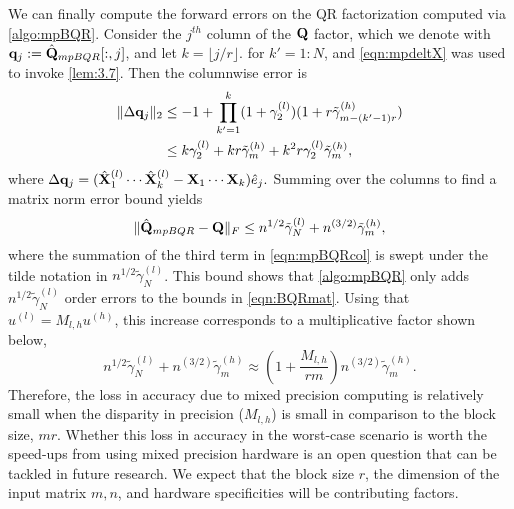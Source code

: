 We can finally compute the forward errors on the QR factorization computed via \cref{algo:mpBQR}.
Consider the $j^{th}$ column of the $\mathbf{Q}$ factor, which we denote with $\mathbf{q}_j:=\hat{\mathbf{Q}}_{mpBQR}[:,j]$, and let $k = \lfloor j/r\rfloor$.
for $k'=1:N$, and \cref{eqn:mpdeltX} was used to invoke \cref{lem:3.7}.
Then the columnwise error is 
\begin{align}
	\|\Delta \bb{q}_j \|_2 &\leq -1 + \prod_{k'=1}^k (1+\gamma_2^{(l)})(1+r\tilde{\gamma}_{m-(k'-1)r}^{(h)})\\ 
	&\leq k\gamma_{2}^{(l)} + kr\tilde{\gamma}_m^{(h)} + k^2r\gamma_{2}^{(l)}\tilde{\gamma}_m^{(h)}, \label{eqn:mpBQRcol}
\end{align} 
where $\Delta \mathbf{q}_j = (\hat{\mathbf{X}}_1^{(l)}\cdots\hat{\mathbf{X}}_k^{(l)} - \mathbf{X}_1\cdots\mathbf{X}_k )\hat{e}_j.$
Summing over the columns to find a matrix norm error bound yields
\begin{equation}
	\|\hat{\mathbf{Q}}_{mpBQR}-\mathbf{Q}\|_F \leq n^{1/2}\tilde{\gamma}_{N}^{(l)} + n^{(3/2)}\tilde{\gamma}_m^{(h)},
\end{equation}
where the summation of the third term in \cref{eqn:mpBQRcol} is swept under the tilde notation in $n^{1/2} \tilde{\gamma}_{N}^{(l)}$.
This bound shows that \cref{algo:mpBQR} only adds $n^{1/2}\tilde{\gamma}_{N}^{(l)}$ order errors to the bounds in \cref{eqn:BQRmat}.
Using that $u^{(l)}=M_{l,h}u^{(h)}$, this increase corresponds to a multiplicative factor shown below,
\begin{equation}
	n^{1/2}\tilde{\gamma}_{N}^{(l)} + n^{(3/2)}\tilde{\gamma}_m^{(h)} \approx \left(1+\frac{M_{l,h}}{rm}\right)n^{(3/2)}\tilde{\gamma}_m^{(h)}. \label{eqn:mpBQR3}
\end{equation}
Therefore, the loss in accuracy due to mixed precision computing is relatively small when the disparity in precision ($M_{l,h}$) is small in comparison to the block size, $mr$.
Whether this loss in accuracy in the worst-case scenario is worth the speed-ups from using mixed precision hardware is an open question that can be tackled in future research.
We expect that the block size $r$, the dimension of the input matrix $m,n$, and hardware specificities will be contributing factors. 

